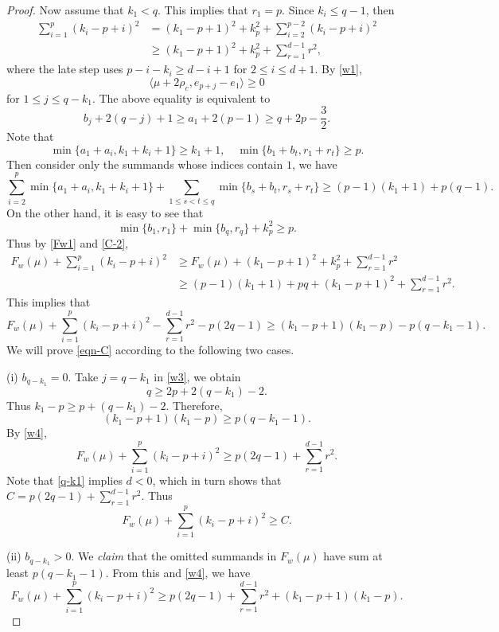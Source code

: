 \documentclass[11pt]{amsart}
\theoremstyle{plain}
\theoremstyle{definition}
\begin{document}
\begin{proof}
	Now assume that $k_1<q$. This implies that $r_1=p$. Since $k_i\le q-1$, then
	\begin{equation}\label{C-2}
	\begin{split}
		\sum_{i=1}^p(k_i-p+i)^2&=(k_1-p+1)^2+k_p^2+\sum_{i=2}^{p-2}(k_i-p+i)^2\\
		&\ge (k_1-p+1)^2+k_p^2+\sum_{r=1}^{d-1}r^2,
	\end{split}
	\end{equation}
	where the late step uses $p-i-k_i\ge d-i+1$ for $2\le i\le d+1$.
	By \eqref{w1},
	\[\langle\mu+2\rho_c, e_{p+j}-e_1\rangle\ge 0\]
	for $1\le j\le q-k_1$. The above equality is equivalent to
	\begin{equation}\label{w3}
		b_j+2(q-j)+1\ge a_1+2(p-1)\ge q+2p-\frac{3}{2}.
	\end{equation}
	Note that
	\[\min\{a_1+a_i,k_1+k_i+1\}\ge k_1+1,\quad \min\{b_1+b_t,r_1+r_t\}\ge p.\]
	Then consider only the summands whose indices contain $1$, we have
	\[\sum_{i=2}^p\min\{a_1+a_i, k_1+k_i+1\}+\sum_{1\le s<t\le q}\min\{b_s+b_t, r_s+r_t\}\ge (p-1)(k_1+1)+p(q-1).\]
	On the other hand, it is easy to see that
	\[\min\{b_1, r_1\}+\min\{b_q, r_q\}+k_p^2\ge p.\]
	Thus by \eqref{Fw1} and \eqref{C-2},
	\begin{align*}
		F_w(\mu)+\sum_{i=1}^p(k_i-p+i)^2&\ge F_w(\mu)+(k_1-p+1)^2+k_p^2+\sum_{r=1}^{d-1}r^2\\
		&\ge (p-1)(k_1+1)+pq+(k_1-p+1)^2+\sum_{r=1}^{d-1}r^2.
	\end{align*}
	This implies that
	\begin{equation}\label{w4}
		F_w(\mu)+\sum_{i=1}^p(k_i-p+i)^2-\sum_{r=1}^{d-1}r^2-p(2q-1)\ge(k_1-p+1)(k_1-p)-p(q-k_1-1).
	\end{equation}
	We will prove \eqref{eqn-C} according to the following two cases.
	
	(i) $b_{q-k_1}=0$. Take $j=q-k_1$ in \eqref{w3}, we obtain
	\begin{equation}\label{q-k1}
		q\ge 2p+2(q-k_1)-2.
	\end{equation}
	Thus $k_1-p\ge p+(q-k_1)-2$. Therefore,
	\[(k_1-p+1)(k_1-p)\ge p(q-k_1-1).\]
	By \eqref{w4},
	\[F_w(\mu)+\sum_{i=1}^p(k_i-p+i)^2\ge p(2q-1)+\sum_{r=1}^{d-1}r^2.\]
	Note that \eqref{q-k1} implies $d<0$, which in turn shows that $C=p(2q-1)+\sum_{r=1}^{d-1}r^2$. Thus
		\[F_w(\mu)+\sum_{i=1}^p(k_i-p+i)^2\ge C.\]
	
	(ii) $b_{q-k_1}>0$. We \emph{claim} that the omitted summands in $F_w(\mu)$ have sum at least $p(q-k_1-1)$. From this and \eqref{w4}, we have
	\begin{equation}\label{C-3}
		F_w(\mu)+\sum_{i=1}^p(k_i-p+i)^2\ge p(2q-1)+\sum_{r=1}^{d-1}r^2+(k_1-p+1)(k_1-p).
	\end{equation}
	

\end{proof}
\end{document}
